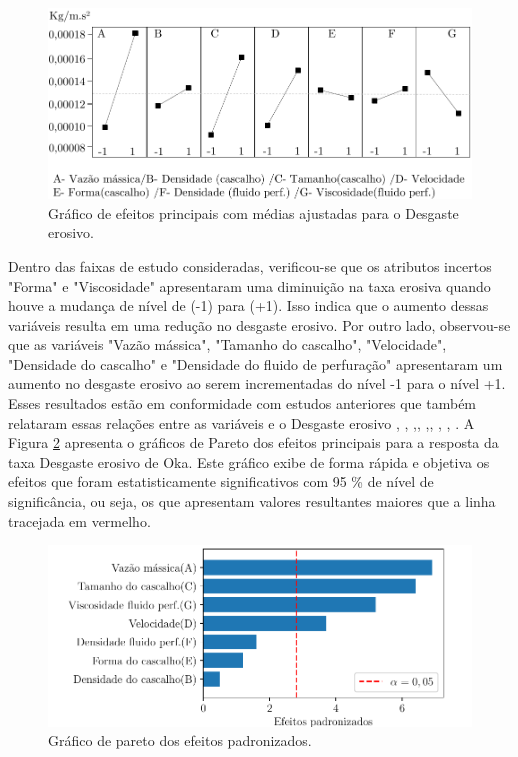 \begin{figure}[H] 
    \centering  
    \includegraphics{Figuras/efeitosPLACKETT.pdf}  
    \caption{Gráfico de efeitos principais com médias ajustadas para o Desgaste erosivo.}  
    \label{fig:efeitosplackett}  
\end{figure}

Dentro das faixas de estudo consideradas, verificou-se que os atributos incertos "Forma" e "Viscosidade" apresentaram uma diminuição na taxa erosiva quando houve a mudança de nível de (-1) para (+1). Isso indica que o aumento dessas variáveis resulta em uma redução no desgaste erosivo. Por outro lado, observou-se que as variáveis "Vazão mássica", "Tamanho do cascalho", "Velocidade", "Densidade do cascalho" e "Densidade do fluido de perfuração" apresentaram um aumento no desgaste erosivo ao serem incrementadas do nível -1 para o nível +1. Esses resultados estão em conformidade com estudos anteriores que também relataram essas relações entre as variáveis e o Desgaste erosivo \cite{yabuki}, \cite{walker}, \cite{hutchings},\cite{clark}, \cite{albu},\cite{kowsari}, \cite{kumar}, \cite{hutchings}, \cite{ANUR}. A Figura \ref{fig:paretoplackett} apresenta o gráficos de Pareto dos efeitos principais para a resposta da taxa Desgaste erosivo de Oka. Este gráfico exibe de forma rápida e objetiva os efeitos que foram estatisticamente significativos com 95 \% de nível de significância, ou seja, os que apresentam valores resultantes maiores que a linha tracejada em vermelho.

\begin{figure}[H] 
    \centering  
    \includegraphics{Figuras/PLACKETTBURMANNNN.pdf}  
    \caption{Gráfico de pareto dos efeitos padronizados.}  
    \label{fig:paretoplackett}  
\end{figure}

